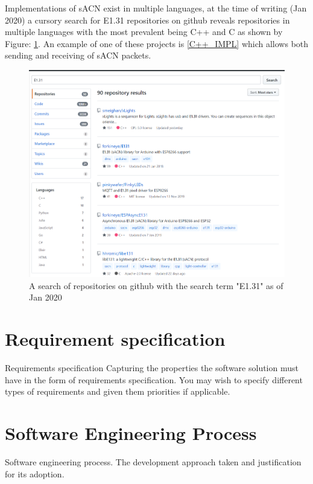 \documentclass[11pt,a4paper]{report}
\begin{document}
	Implementations of sACN exist in multiple languages, at the time of writing (Jan 2020) a cursory search for E1.31 repositories on github reveals repositories in multiple languages with the most prevalent being C++ and C as shown by Figure: \ref{E131_REPO_SEARCH}. An example of one of these projects is \ref{C++_IMPL} which allows both sending and receiving of sACN packets.
	
	\begin{figure}
		\label{E131_REPO_SEARCH}
		\includegraphics[width=\textwidth]{E131-Repo-Search}
		\caption{A search of repositories on github with the search term "E1.31" as of Jan 2020}
	\end{figure}

	\section{Requirement specification}
	Requirements
	specification
	Capturing the properties the software solution must
	have in the form of requirements specification. You
	may wish to specify different types of requirements and
	given them priorities if applicable.
	
\section{Software Engineering Process}
Software engineering process. The development approach taken and justification for its adoption.
\end{document}
